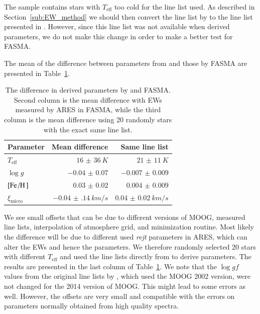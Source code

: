 \documentclass{aa}
\begin{document}
The sample contains stars with $T_\mathrm{eff}$ too cold for the line list used.
As described in Section~\ref{sub:EW_method} we should then convert the line list
by \citet{Sousa2008a} to the line list presented in \citet{Tsantaki2013}.
However, since this line list was not available when \citet{Sousa2011} derived
parameters, we do not make this change in order to make a better test for
FASMA.

The mean of the difference between parameters from \citet{Sousa2011} and those
by FASMA are presented in Table~\ref{tab:FASMATest}.

\begin{table}[htb!]
    \caption{The difference in derived parameters by \citet{Sousa2011}
    and FASMA. Second column is the mean difference with EWs measured by
    ARES in FASMA, while the third column is the mean difference using
    20 randomly stars with the exact same line list.}
    \label{tab:FASMATest}
    \centering
    \begin{tabular}{lrr}
      \hline\hline
      Parameter             &  Mean difference         & Same line list        \\
      \hline
      $T_\mathrm{eff}$      &  $\SI{16(36)}{K}$        & $\SI{21(11)}{K}$      \\
      $\log g$              &  $\num{-0.04(7)}$        & $\num{-0.007(9)}$     \\
      $[\ion{Fe}/\ion{H}]$  &  $\num{0.03(2)}$         & $\num{0.004(9)}$      \\
      $\xi_\mathrm{micro}$  &  $\SI{-0.04(14)}{km/s}$  & $\SI{0.04(2)}{km/s}$  \\
      \hline
    \end{tabular}
\end{table}

We see small offsets that can be due to different versions of MOOG, measured
line lists, interpolation of atmosphere grid, and minimization routine. Most
likely the difference will be due to different used \emph{rejt} parameters in
ARES, which can alter the EWs and hence the parameters. We therefore randomly
selected 20 stars with different $T_\mathrm{eff}$ and used the line lists
directly from \citet{Sousa2011} to derive parameters. The results are presented
in the last column of Table~\ref{tab:FASMATest}. We note that the $\log gf$
values from the original line lists by \citet{Sousa2011}, which used the MOOG
2002 version, were not changed for the 2014 version of MOOG. This might lead to
some errors as well. However, the offsets are very small and compatible with the
errors on parameters normally obtained from high quality spectra.
\end{document}
